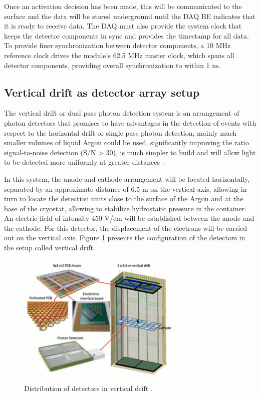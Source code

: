 \documentclass[a4paper,10pt,epsfig,epsf,amsfonts,amsmath]{article}
\begin{document}
Once an activation decision has been made, this will be communicated to the surface and the data will be stored underground until the DAQ BE indicates that it is ready to receive data. The DAQ must also provide the system clock that keeps the detector components in sync and provides the timestamp for all data. To provide finer synchronization between detector components, a 10 MHz reference clock drives the module's 62.5 MHz master clock, which spans all detector components, providing overall synchronization to within 1 ns.



\subsection{Vertical drift as detector array setup}

The vertical drift or dual pass photon detection system is an arrangement of photon detectors that promises to have advantages in the detection of events with respect to the horizontal drift or single pass photon detection, mainly much smaller volumes of liquid Argon could be used, significantly improving the ratio signal-to-noise detection (S/N > 30), is much simpler to build and will allow light to be detected more uniformly at greater distances \cite{Pietropaolo:2792672}.

In this system, the anode and cathode arrangement will be located horizontally, separated by an approximate distance of 6.5 m on the vertical axis, allowing in turn to locate the detection units close to the surface of the Argon and at the base of the cryostat, allowing to stabilize hydrostatic pressure in the container. An electric field of intensity 450 V/cm will be established between the anode and the cathode. For this detector, the displacement of the electrons will be carried out on the vertical axis. Figure \ref{Fig_X3} presents the configuration of the detectors in the setup called vertical drift.


\begin{figure}[hbtp]
\centering
\includegraphics[width=0.7\textwidth]{Vert_Drift.png}
\caption{Distribution of detectors in vertical drift \cite{Abi_2020}.}
\label{Fig_X3}
\end{figure}
\end{document}

